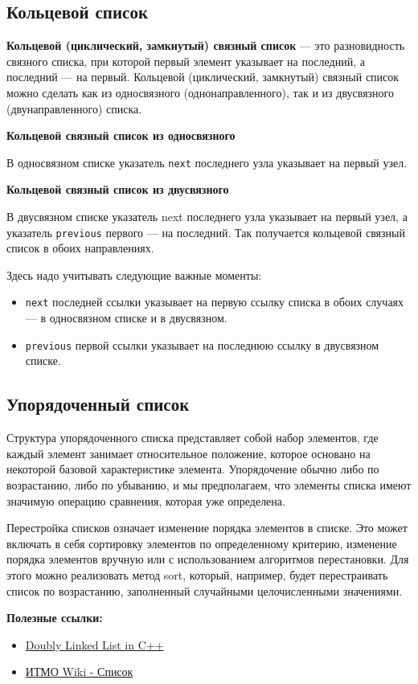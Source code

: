 \subsection{Кольцевой список}

\textbf{Кольцевой (циклический, замкнутый) связный список} — это разновидность связного списка, при которой первый элемент указывает на последний, а последний — на первый. Кольцевой (циклический, замкнутый) связный список можно сделать как из односвязного (однонаправленного), так и из двусвязного (двунаправленного) списка.

\textbf{Кольцевой связный список из односвязного}

В односвязном списке указатель \texttt{next} последнего узла указывает на первый узел.

\textbf{Кольцевой связный список из двусвязного}

В двусвязном списке указатель next последнего узла указывает на первый узел, а указатель \texttt{previous} первого — на последний. Так получается кольцевой связный список в обоих направлениях.

Здесь надо учитывать следующие важные моменты:
\begin{itemize}
    \item \texttt{next} последней ссылки указывает на первую ссылку списка в обоих случаях — в односвязном списке и в двусвязном.
    \item \texttt{previous} первой ссылки указывает на последнюю ссылку в двусвязном списке.
\end{itemize}

\subsection{Упорядоченный список}

Структура упорядоченного списка представляет собой набор элементов, где каждый элемент занимает относительное положение, которое основано на некоторой базовой характеристике элемента. Упорядочение обычно либо по возрастанию, либо по убыванию, и мы предполагаем, что элементы списка имеют значимую операцию сравнения, которая уже определена.

Перестройка списков означает изменение порядка элементов в списке. Это может включать в себя сортировку элементов по определенному критерию, изменение порядка элементов вручную или с использованием алгоритмов перестановки. Для этого можно реализовать метод sort, который, например, будет перестраивать список по возрастанию, заполненный случайными целочисленными значениями.

\textbf{Полезные ссылки:}
\begin{itemize}
    \item \href{https://www.geeksforgeeks.org/doubly-linked-list-in-cpp/}{Doubly Linked List in C++}
    \item \href{https://neerc.ifmo.ru/wiki/index.php?title=%D0%A1%D0%BF%D0%B8%D1%81%D0%BE%D0%BA}{ИТМО Wiki - Список}
\end{itemize}
